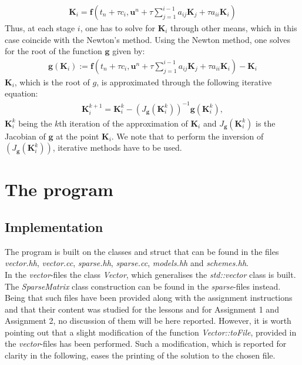 \documentclass[11pt]{article}
\theoremstyle{theorem}
\theoremstyle{definition}
\begin{document}
\begin{align}
\label{eqn:K_i}
\mathbf{K}_i = \mathbf{f}\left(t_n + \tau c_i, \mathbf{u}^n + \tau\sum_{j=1}^{i-1}a_{ij}\mathbf{K}_j + \tau a_{ii}\mathbf{K}_i\right)
\end{align}
Thus, at each stage $ i $, one has to solve for $ \mathbf{K}_i $ through other means, which in this case coincide with the Newton's method. Using the Newton method, one solves for the root of the function $ \mathbf{g} $ given by:
\begin{align*}
\mathbf{g}(\mathbf{K}_i) := \mathbf{f}\left(t_n + \tau c_i, \mathbf{u}^n + \tau\sum_{j=1}^{i-1}a_{ij}\mathbf{K}_j + \tau a_{ii}\mathbf{K}_i\right) - \mathbf{K}_i
\end{align*}
$\mathbf{K}_i $, which is the root of $g$, is approximated through the following iterative equation:
\begin{align*}
\mathbf{K}_i^{k+1} = \mathbf{K}_i^{k} - (J_\mathbf{g}(\mathbf{K}_{i}^{k}))^{-1}\mathbf{g}(\mathbf{K}_{i}^{k}),
\end{align*}
$ \mathbf{K}_i^k $ being the $ k $th iteration of the approximation of $ \mathbf{K}_i $ and $J_\mathbf{g}(\mathbf{K}_{i}^{k})$ is the Jacobian of $\mathbf{g}$ at the point $\mathbf{K}_i$. We note that to perform the inversion of $(J_\mathbf{g}(\mathbf{K}_{i}^{k})) $, iterative methods have to be used.\\



\section{The program}
\subsection{Implementation}
The program is built on the classes and struct that can be found in the files \emph{vector.hh}, \emph{vector.cc}, \emph{sparse.hh}, \emph{sparse.cc}, \emph{models.hh} and \emph{schemes.hh}.\\
In the \emph{vector}-files the class \emph{Vector}, which generalises the \emph{std::vector} class is built. The \emph{SparseMatrix} class construction can be found in the \emph{sparse}-files instead. Being that such files have been provided along with the assignment instructions and that their content was studied for the lessons and for Assignment 1 and Assignment 2, no discussion of them will be here reported. However, it is worth pointing out that a slight modification of the function \emph{Vector::toFile}, provided in the \emph{vector}-files has been performed. Such a modification, which is reported for clarity in the following, eases the printing of the solution to the chosen file.\\
\end{document}

